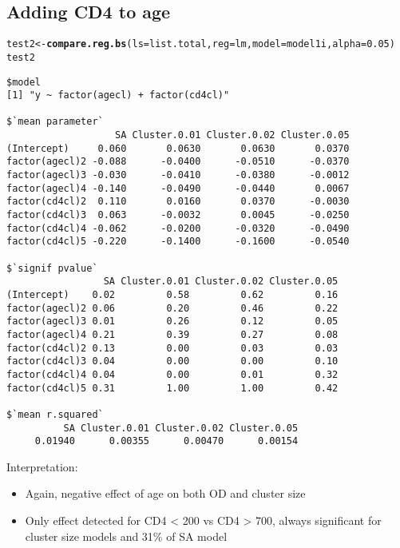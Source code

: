 \documentclass[]{revtex4}\usepackage[]{graphicx}\usepackage[]{color}
\makeatletter
\newcommand{\hlnum}[1]{\textcolor[rgb]{0.686,0.059,0.569}{#1}}%
\newcommand{\hlstd}[1]{\textcolor[rgb]{0.345,0.345,0.345}{#1}}%
\newcommand{\hlkwb}[1]{\textcolor[rgb]{0.69,0.353,0.396}{#1}}%
\newcommand{\hlkwc}[1]{\textcolor[rgb]{0.333,0.667,0.333}{#1}}%
\newcommand{\hlkwd}[1]{\textcolor[rgb]{0.737,0.353,0.396}{\textbf{#1}}}%
\newenvironment{kframe}{%
 \def\at@end@of@kframe{}%
 \ifinner\ifhmode%
  \def\at@end@of@kframe{\end{minipage}}%
  \begin{minipage}{\columnwidth}%
 \fi\fi%
 \def\FrameCommand##1{\hskip\@totalleftmargin \hskip-\fboxsep
 \colorbox{shadecolor}{##1}\hskip-\fboxsep
     \hskip-\linewidth \hskip-\@totalleftmargin \hskip\columnwidth}%
 \MakeFramed {\advance\hsize-\width
   \@totalleftmargin\z@ \linewidth\hsize
   \@setminipage}}%
 {\par\unskip\endMakeFramed%
 \at@end@of@kframe}
\newenvironment{knitrout}{}{} %
\makeatother
\begin{document}
\subsection*{Adding CD4 to age}
\begin{knitrout}
\color{fgcolor}\begin{kframe}
\begin{alltt}
\hlstd{test2} \hlkwb{<-} \hlkwd{compare.reg.bs}\hlstd{(}\hlkwc{ls} \hlstd{= list.total,} \hlkwc{reg} \hlstd{= lm,} \hlkwc{model} \hlstd{= model1i,} \hlkwc{alpha} \hlstd{=} \hlnum{0.05}\hlstd{)}
\hlstd{test2}
\end{alltt}
\begin{verbatim}
$model
[1] "y ~ factor(agecl) + factor(cd4cl)"

$`mean parameter`
                   SA Cluster.0.01 Cluster.0.02 Cluster.0.05
(Intercept)     0.060       0.0630       0.0630       0.0370
factor(agecl)2 -0.088      -0.0400      -0.0510      -0.0370
factor(agecl)3 -0.030      -0.0410      -0.0380      -0.0012
factor(agecl)4 -0.140      -0.0490      -0.0440       0.0067
factor(cd4cl)2  0.110       0.0160       0.0370      -0.0030
factor(cd4cl)3  0.063      -0.0032       0.0045      -0.0250
factor(cd4cl)4 -0.062      -0.0200      -0.0320      -0.0490
factor(cd4cl)5 -0.220      -0.1400      -0.1600      -0.0540

$`signif pvalue`
                 SA Cluster.0.01 Cluster.0.02 Cluster.0.05
(Intercept)    0.02         0.58         0.62         0.16
factor(agecl)2 0.06         0.20         0.46         0.22
factor(agecl)3 0.01         0.26         0.12         0.05
factor(agecl)4 0.21         0.39         0.27         0.08
factor(cd4cl)2 0.13         0.00         0.03         0.03
factor(cd4cl)3 0.04         0.00         0.00         0.10
factor(cd4cl)4 0.04         0.00         0.01         0.32
factor(cd4cl)5 0.31         1.00         1.00         0.42

$`mean r.squared`
          SA Cluster.0.01 Cluster.0.02 Cluster.0.05 
     0.01940      0.00355      0.00470      0.00154 
\end{verbatim}
\end{kframe}
\end{knitrout}
Interpretation: 
\begin{itemize}
\item Again, negative effect of age on both OD and cluster size
\item Only effect detected for CD4 < 200 vs CD4 > 700, always significant for cluster size models and 31\% of SA model
\end{itemize}
\end{document}
